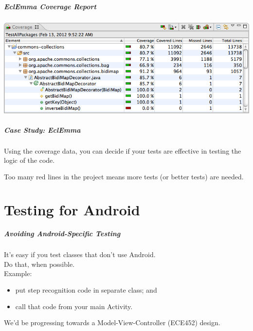\begin{frame}
\frametitle{EclEmma Coverage Report}
\begin{center}
	\includegraphics[width=\textwidth]{images/coverageview.png}
\end{center}
\end{frame}

\begin{frame}
\frametitle{Case Study: EclEmma}
\begin{changemargin}{1cm}
Using the coverage data, you can decide if your tests are effective in testing the logic of the code. 

Too many red lines in the project means more tests (or better tests) are needed.


\end{changemargin}
\end{frame}


\part{Testing for Android}
\frame{\partpage}

\begin{frame}
\frametitle{Avoiding Android-Specific Testing}

\begin{changemargin}{1cm}
It's easy if you test classes that don't use Android.\\[1em]

Do that, when possible.\\[1em]

Example:
\begin{itemize}
\item put step recognition code in separate class; and
\item call that code from your main Activity.
\end{itemize}
We'd be progressing towards a Model-View-Controller (ECE452) design.

\end{changemargin}
\end{frame}

